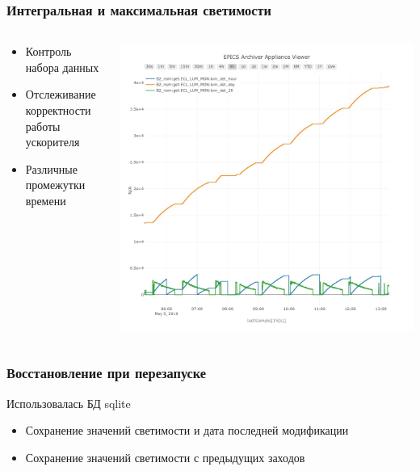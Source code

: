 \documentclass{beamer}
\begin{document}
\begin{frame}
\frametitle{Интегральная и максимальная светимости}
    \begin{columns}
        \begin{column}{0.5\textwidth}
            \begin{itemize}
                \item Контроль набора данных
                \item Отслеживание корректности работы ускорителя
                \item Различные промежутки времени
            \end{itemize}
        \end{column}
        \begin{column}{0.5\textwidth}
            \includegraphics[width=\textwidth]{Int_lum.jpeg}
        \end{column}
    \end{columns}
\end{frame}


\begin{frame}
\frametitle{Восстановление при перезапуске}
    Использовалась БД sqlite
    \begin{itemize}
        \item Сохранение значений светимости и дата последней модификации
        \item Сохранение значений светимости с предыдущих заходов
    \end{itemize}
\end{frame}
\end{document}
